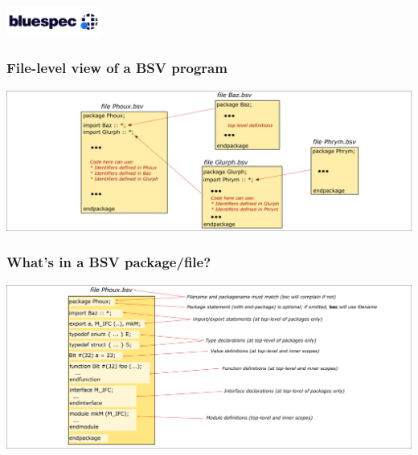 



\date{L3: Structure of BSV Programs}





\begin{frame}
 \titlepage

 \begin{center}
  \includegraphics[height=1cm]{../Figures/Bluespec_Logo_2022-10}
 \end{center}
\end{frame}


\begin{frame}
\frametitle{File-level view of a BSV program}

\begin{center}
\includegraphics[width=\textwidth]{../Figures/Fig_BSV_program_structure}
\end{center}

\end{frame}


\begin{frame}
\frametitle{What's in a BSV package/file?}

\begin{center}
\includegraphics[width=\textwidth]{../Figures/Fig_BSV_Package}
\end{center}

\end{frame}

